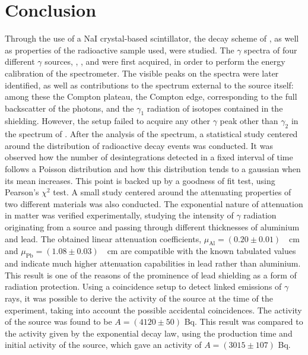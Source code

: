\section{Conclusion}
Through the use of a NaI crystal-based scintillator, the decay scheme of \cobalt, as well as properties of the radioactive sample used, were studied.
The $\gamma$ spectra of four different $\gamma$ sources, \cesium, \cobalt, \lead and \hafnium were first acquired, in order to perform the energy calibration of the spectrometer.
The visible peaks on the spectra were later identified, as well as contributions to the spectrum external to the source itself:
among these the Compton plateau, the Compton edge, corresponding to the full backscatter of the photons, and the $\gamma_1$ radiation of \lead isotopes contained in the shielding.
However, the setup failed to acquire any other $\gamma$ peak other than $\gamma_2$ in the spectrum of \hafnium.
After the analysis of the spectrum, a statistical study centered around the distribution of radioactive decay events was conducted.
It was observed how the number of desintegrations detected in a fixed interval of time follows a Poisson distribution and how this distribution tends to a gaussian when its mean increases.
This point is backed up by a goodness of fit test, using Pearson's \(\chi^2\) test.
A small study centered around the attenuating properties of two different materials was also conducted.
The exponential nature of attenuation in matter was verified experimentally, studying the intensity of $\gamma$ radiation originating from a \cesium source and passing through different thicknesses of aluminium and lead.
The obtained linear attenuation coefficients, \mbox{$\mu_{\mathrm{Al}} = (0.20 \pm 0.01)$ \unit{\per\cm}} and \mbox{$\mu_{\mathrm{Pb}} = (1.08 \pm 0.03)$ \unit{\per\cm}} are compatible with the known tabulated values and indicate much higher attenuation capabilities in lead rather than aluminium.
This result is one of the reasons of the prominence of lead shielding as a form of radiation protection.
Using a coincidence setup to detect linked emissions of \(\gamma\) rays, it was possible to derive the activity of the \cobalt source at the time of the experiment, taking into account the possible accidental coincidences.
The activity of the source was found to be $A = (4120 \pm 50)$ Bq.
This result was compared to the activity given by the exponential decay law, using the production time and initial activity of the source, which gave an activity of \(A = (3015 \pm 107)\) Bq.
